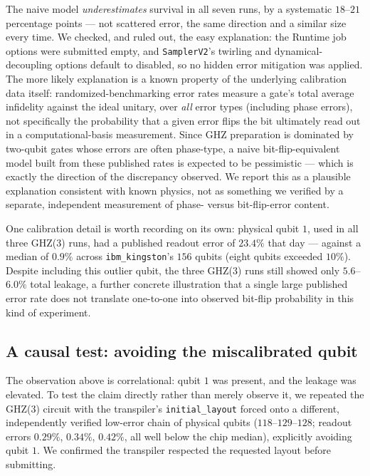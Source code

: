 \documentclass[11pt]{article}
\begin{document}
The naive model \emph{underestimates} survival in all seven runs, by a
systematic $18$--$21$ percentage points --- not scattered error, the same
direction and a similar size every time. We checked, and ruled out, the
easy explanation: the Runtime job options were submitted empty, and
\texttt{SamplerV2}'s twirling and dynamical-decoupling options default to
disabled, so no hidden error mitigation was applied. The more likely
explanation is a known property of the underlying calibration data
itself: randomized-benchmarking error rates measure a gate's total
average infidelity against the ideal unitary, over \emph{all} error
types (including phase errors), not specifically the probability that a
given error flips the bit ultimately read out in a computational-basis
measurement. Since GHZ preparation is dominated by two-qubit gates whose
errors are often phase-type, a naive bit-flip-equivalent model built
from these published rates is expected to be pessimistic --- which is
exactly the direction of the discrepancy observed. We report this as a
plausible explanation consistent with known physics, not as something we
verified by a separate, independent measurement of phase- versus
bit-flip-error content.

One calibration detail is worth recording on its own: physical qubit
$1$, used in all three GHZ(3) runs, had a published readout error of
$23.4\%$ that day --- against a median of $0.9\%$ across
\texttt{ibm\_kingston}'s $156$ qubits (eight qubits exceeded $10\%$).
Despite including this outlier qubit, the three GHZ(3) runs still showed
only $5.6$--$6.0\%$ total leakage, a further concrete illustration that a
single large published error rate does not translate one-to-one into
observed bit-flip probability in this kind of experiment.

\subsection{A causal test: avoiding the miscalibrated qubit}

The observation above is correlational: qubit $1$ was present, and the
leakage was elevated. To test the claim directly rather than merely
observe it, we repeated the GHZ(3) circuit with the transpiler's
\texttt{initial\_layout} forced onto a different, independently verified
low-error chain of physical qubits ($118$--$129$--$128$; readout errors
$0.29\%$, $0.34\%$, $0.42\%$, all well below the chip median), explicitly
avoiding qubit $1$. We confirmed the transpiler respected the requested
layout before submitting.
\end{document}
